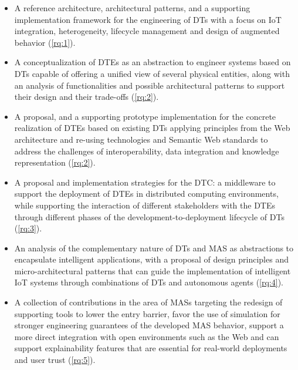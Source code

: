 \begin{itemize}[leftmargin=2.3cm]
    \item[\textbf{\Cref{chap:dte:engineering-dt}}] A reference architecture, architectural patterns, and a supporting implementation framework for the engineering of \acp{DT} with a focus on \ac{IoT} integration, heterogeneity, lifecycle management and design of augmented behavior (\ref{rq:1}).

    \item[\textbf{\Cref{chap:dte:dte}}] A conceptualization of \acp{DTE} as an abstraction to engineer systems based on \acp{DT} capable of offering a unified view of several physical entities, along with an analysis of functionalities and possible architectural patterns to support their design and their trade-offs (\ref{rq:2}).
    
    \item[\textbf{\Cref{chap:dte:hwodt}}] A proposal, and a supporting prototype implementation for the concrete realization of \acp{DTE} based on existing \acp{DT} applying principles from the Web architecture and re-using technologies and Semantic Web standards to address the challenges of interoperability, data integration and knowledge representation (\ref{rq:2}).

    \item[\textbf{\Cref{chap:dte:dtc}}] A proposal and implementation strategies for the \ac{DTC}: a middleware to support the deployment of \acp{DTE} in distributed computing environments, while supporting the interaction of different stakeholders with the \acp{DTE} through different phases of the development-to-deployment lifecycle of \acp{DT} (\ref{rq:3}). 

    \item[\textbf{\Cref{chap:mas:mas-dt}}] An analysis of the complementary nature of \acp{DT} and \ac{MAS} as abstractions to encapsulate intelligent applications, with a proposal of design principles and micro-architectural patterns that can guide the implementation of intelligent \ac{IoT} systems through combinations of \acp{DT} and autonomous agents (\ref{rq:4}).
    
    \item[\textbf{\Cref{chap:mas:engineering}}] A collection of contributions in the area of \acp{MAS} targeting the redesign of supporting tools to lower the entry barrier, favor the use of simulation for stronger engineering guarantees of the developed \ac{MAS} behavior, support a more direct integration with open environments such as the Web and can support explainability features that are essential for real-world deployments and user trust (\ref{rq:5}).
    
\end{itemize}

